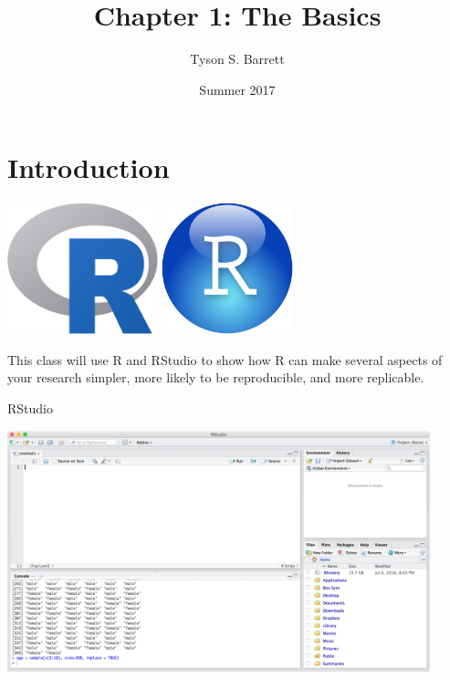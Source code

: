 \documentclass[ignorenonframetext,]{beamer}
\title{Chapter 1: The Basics}
\author{Tyson S. Barrett}
\institute{Utah State University}
\date{Summer 2017}
\begin{document}
\frame{\titlepage}

\begin{frame}
\tableofcontents[hideallsubsections]
\end{frame}

\section{Introduction}\label{introduction}

\begin{frame}

\centerline{\includegraphics[height=1.5in]{Figures/Rlogo.png} 
\includegraphics[height=1.5in]{Figures/RStudio_logo.png}}

\vspace{6pt}

\centering
This class will use R and RStudio to show how R can make several aspects
of your research simpler, more likely to be reproducible, and more
replicable.

\end{frame}

\begin{frame}{RStudio}

\centerline{\includegraphics[height=2.75in]{Figures/FourPanes.png}}

\end{frame}
\end{document}
